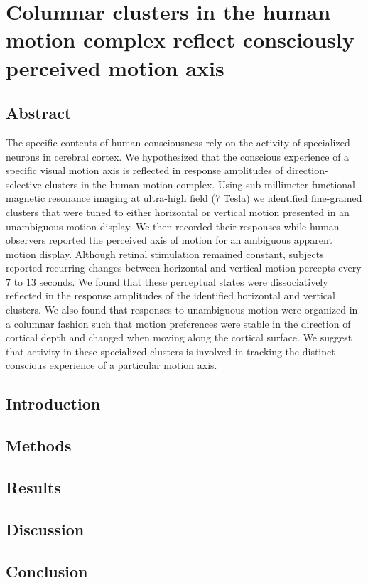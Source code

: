 \chapter{Columnar clusters in the human motion complex reflect consciously perceived motion axis}

\clearpage
\section{Abstract}
The specific contents of human consciousness rely on the activity of specialized neurons in cerebral cortex. We hypothesized that the conscious experience of a specific visual motion axis is reflected in response amplitudes of direction-selective clusters in the human motion complex. Using sub-millimeter functional magnetic resonance imaging at ultra-high field (7 Tesla) we identified fine-grained clusters that were tuned to either horizontal or vertical motion presented in an unambiguous motion display. We then recorded their responses while human observers reported the perceived axis of motion for an ambiguous apparent motion display. Although retinal stimulation remained constant, subjects reported recurring changes between horizontal and vertical motion percepts every 7 to 13 seconds. We found that these perceptual states were dissociatively reflected in the response amplitudes of the identified horizontal and vertical clusters. We also found that responses to unambiguous motion were organized in a columnar fashion such that motion preferences were stable in the direction of cortical depth and changed when moving along the cortical surface. We suggest that activity in these specialized clusters is involved in tracking the distinct conscious experience of a particular motion axis.


\section{Introduction}
\lipsum[1-1]

\section{Methods}
\lipsum[1-2]

\section{Results}
\lipsum[1-3] 
\cite{Lakatos1970}

\section{Discussion}
\lipsum[1-4]

\section{Conclusion}
\lipsum[1-5]

\clearpage
\printbibliography[heading=subbibnumbered, title={References}]